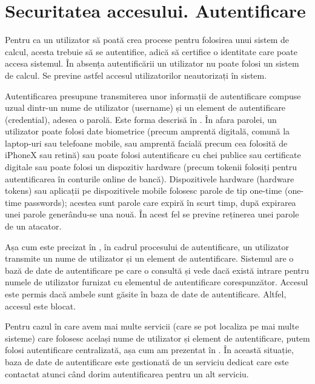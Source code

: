 \section{Securitatea accesului. Autentificare}
\label{sec:sec:auth}

Pentru ca un utilizator să poată crea procese pentru folosirea unui sistem de calcul, acesta trebuie să se autentifice, adică să certifice o identitate care poate accesa sistemul. În absența autentificării un utilizator nu poate folosi un sistem de calcul. Se previne astfel accesul utilizatorilor neautorizați în sistem.

Autentificarea presupune transmiterea unor informații de autentificare compuse uzual dintr-un nume de utilizator (username) și un element de autentificare (credential), adesea o parolă. Este forma descrisă în . În afara parolei, un utilizator poate folosi date biometrice (precum amprentă digitală, comună la laptop-uri sau telefoane mobile, sau amprentă facială precum cea folosită de iPhoneX sau retină) sau poate folosi autentificare cu chei publice sau certificate digitale sau poate folosi un dispozitiv hardware (precum tokenii folosiți pentru autentificarea în conturile online de bancă). Dispozitivele hardware (hardware tokens) sau aplicații pe dispozitivele mobile folosesc parole de tip one-time (one-time passwords); acestea sunt parole care expiră în scurt timp, după expirarea unei parole generându-se una nouă. În acest fel se previne reținerea unei parole de un atacator.

Așa cum este precizat în , în cadrul procesului de autentificare, un utilizator transmite un nume de utilizator și un element de autentificare. Sistemul are o bază de date de autentificare pe care o consultă și vede dacă există intrare pentru numele de utilizator furnizat cu elementul de autentificare corespunzător. Accesul este permis dacă ambele sunt găsite în baza de date de autentificare. Altfel, accesul este blocat.

Pentru cazul în care avem mai multe servicii (care se pot localiza pe mai multe sisteme) care folosesc același nume de utilizator și element de autentificare, putem folosi autentificare centralizată, așa cum am prezentat în . În această situație, baza de date de autentificare este gestionată de un serviciu dedicat care este contactat atunci când dorim autentificarea pentru un alt serviciu.

